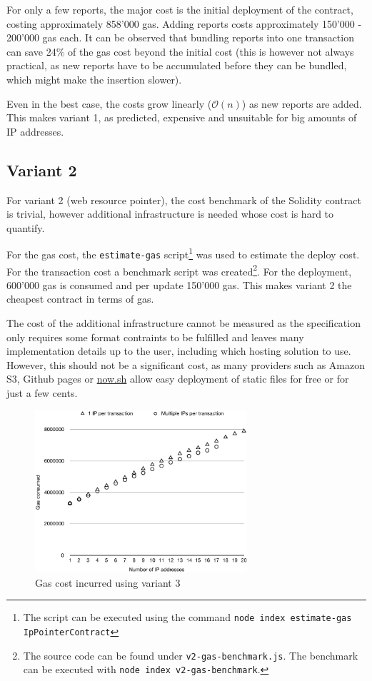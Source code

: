 For only a few reports, the major cost is the initial deployment of the contract, costing approximately 858'000 gas. Adding reports costs approximately 150'000 - 200'000 gas each.
It can be observed that bundling reports into one transaction can save 24\% of the gas cost beyond the initial cost (this is however not always practical, as new reports have to be accumulated before they can be bundled, which might make the insertion slower).

Even in the best case, the costs grow linearly ($\mathcal{O}(n)$) as new reports are added. This makes variant 1, as predicted, expensive and unsuitable for big amounts of IP addresses.

\subsection{Variant 2}
For variant 2 (web resource pointer), the cost benchmark of the Solidity contract is trivial, however additional infrastructure is needed whose cost is hard to quantify.

For the gas cost, the \texttt{estimate-gas} script\footnote{The script can be executed using the command \texttt{node index estimate-gas IpPointerContract}} was used to estimate the deploy cost. For the transaction cost a benchmark script was created\footnote{The source code can be found under \texttt{v2-gas-benchmark.js}. The benchmark can be executed with \texttt{node index v2-gas-benchmark}.}. For the deployment, 600'000 gas is consumed and per update 150'000 gas. This makes variant 2 the cheapest contract in terms of gas.

The cost of the additional infrastructure cannot be measured as the specification only requires some format contraints to be fulfilled and leaves many implementation details up to the user, including which hosting solution to use. However, this should not be a significant cost, as many providers such as Amazon S3, Github pages or \url{now.sh} allow easy deployment of static files for free or for just a few cents.

\begin{figure}[H]
\centering
\includegraphics[width=0.7\textwidth]{v3-gas-cost.pdf}
\caption{Gas cost incurred using variant 3}
\label{fig:v3-gas-cost}
\end{figure}

